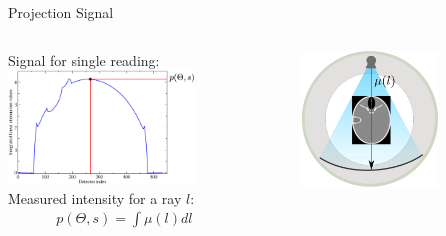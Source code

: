 \begin{frame}
\begin{minipage}{0.45\textwidth}
\begin{figure}
        \end{figure}
    \end{minipage}
\end{frame}

\begin{frame}{Projection Signal}

    \begin{columns}[c, onlytextwidth]
        \begin{column}{0.6\textwidth}
            Signal for single reading: \\
            \includegraphics[width=0.8\textwidth]{images/projsig.eps}\\
            Measured intensity for a ray $l$:
            \begin{eqnarray*}
                p(\Theta, s) = \int{\mu}(l)dl
            \end{eqnarray*}
        \end{column}\begin{column}{0.4\textwidth}
            \begin{figure}
                \includegraphics[width=0.8\textwidth]{images/multict3.eps}
            \end{figure}
        \end{column}
    \end{columns}
\end{frame}

